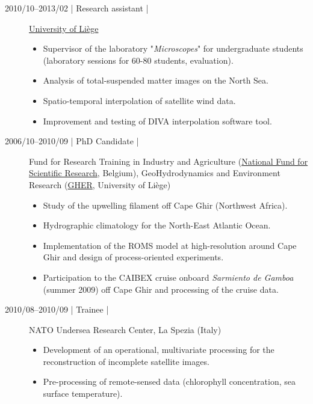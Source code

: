 \documentclass[11pt,a4paper,svgnames]{article}
\begin{document}
\begin{description}
\item[2010/10--2013/02 | Research assistant |] \href{www.ulg.ac.be}{University of Li\`{e}ge}
\begin{itemize}%
\item Supervisor of the laboratory "\textit{Microscopes}" for undergraduate students\\ (laboratory sessions for 60-80 students, evaluation).
\item Analysis of total-suspended matter images on the North Sea.
\item Spatio-temporal interpolation of satellite wind data.
\item Improvement and testing of DIVA interpolation software tool.
\end{itemize}


\item[2006/10--2010/09 | PhD Candidate |] Fund for Research Training in Industry and Agriculture (\href{https://www.fnrs.be}{National Fund for Scientific Research}, Belgium), GeoHydrodynamics and Environment Research (\href{http://modb.oce.ulg.ac.be/}{GHER}, University of Li\`{e}ge)

\parbox{.65\textwidth}{
\begin{itemize}%
\item Study of the upwelling filament off Cape Ghir (Northwest Africa).
\item Hydrographic climatology for the North-East Atlantic Ocean.
\item Implementation of the ROMS model at high-resolution around Cape Ghir and design of process-oriented experiments.
\item Participation to the CAIBEX cruise onboard \textit{Sarmiento de Gamboa} (summer 2009) off Cape Ghir and processing of the cruise data.
\end{itemize}
}\hspace{.5cm}\parbox{.25\textwidth}{
    
}


\item[2010/08--2010/09 | Trainee |] NATO Undersea Research Center, La Spezia (Italy)

\parbox{.65\textwidth}{
\begin{itemize}%
\item Development of an operational, multivariate processing for the reconstruction of incomplete satellite images.
\item Pre-processing of remote-sensed data (chlorophyll concentration, sea surface temperature).
\end{itemize}
}\hspace{.5cm}\parbox{.25\textwidth}{
}



\end{description}
\end{document}
